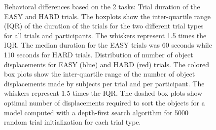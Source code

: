 \begin{figure}[h]
    \centering
    \hspace{2cm}
    \caption{Behavioral differences based on the 2 tasks: \protect{} Trial duration of the EASY and HARD trials. The boxplots show the inter-quartile range (IQR) of the duration of the trials for the two different trial types for all trials and participants. The whiskers represent 1.5 times the IQR. The median duration for the EASY trials was 60 seconds while 110 seconds for HARD trials.\protect{} Distribution of number of object displacements for EASY (blue) and HARD (red) trials. The colored box plots show the inter-quartile range of the number of object displacements made by subjects per trial and per participant. The whiskers represent 1.5 times the IQR. The dashed box plots show optimal number of displacements required to sort the objects for a model computed with a depth-first search algorithm for 5000 random trial initialization for each trial type.
    }
\end{figure}

